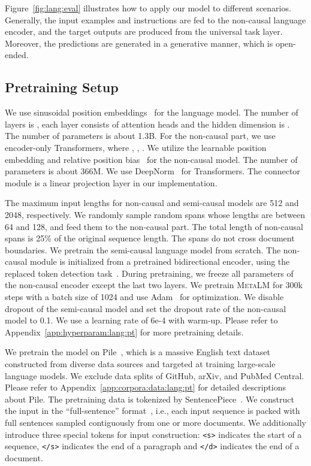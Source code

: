 \documentclass{article}
\theoremstyle{plain}
\theoremstyle{definition}
\theoremstyle{remark}
\newcommand\ours{\textsc{MetaLM}}
\begin{document}
Figure~\ref{fig:lang:eval} illustrates how to apply our model to different scenarios.
Generally, the input examples and instructions are fed to the non-causal language encoder, and the target outputs are produced from the universal task layer.
Moreover, the predictions are generated in a generative manner, which is open-ended.

\subsection{Pretraining Setup}
\label{sec:lang:setup}


We use sinusoidal position embeddings~\citep{transformer} for the language model.
The number of layers is , each layer consists of  attention heads and the hidden dimension is .
The number of parameters is about 1.3B.
For the non-causal part, we use encoder-only Transformers, where , , .
We utilize the learnable position embedding and relative position bias~\citep{t5} for the non-causal model.
The number of parameters is about 366M.
We use DeepNorm~\citep{deepnet} for Transformers.
The connector module is a linear projection layer in our implementation.

The maximum input lengths for non-causal and semi-causal models are 512 and 2048, respectively.
We randomly sample random spans whose lengths are between 64 and 128, and feed them to the non-causal part.
The total length of non-causal spans is 25\% of the original sequence length.
The spans do not cross document boundaries.
We pretrain the semi-causal language model from scratch.
The non-causal module is initialized from a pretrained bidirectional encoder, using the replaced token detection task~\citep{electra}.
During pretraining, we freeze all parameters of the non-causal encoder except the last two layers.
We pretrain \ours{} for 300k steps with a batch size of 1024 and use Adam~\citep{adam} for optimization.
We disable dropout of the semi-causal model and set the dropout rate of the non-causal model to 0.1.
We use a learning rate of 6e-4 with warm-up.
Please refer to Appendix~\ref{app:hyperparam:lang:pt} for more pretraining details.

We pretrain the model on Pile~\citep{pile}, which is a massive English text dataset constructed from diverse data sources and targeted at training large-scale language models.
We exclude data splits of GitHub, arXiv, and PubMed Central.
Please refer to Appendix~\ref{app:corpora:data:lang:pt} for detailed descriptions about Pile.
The pretraining data is tokenized by SentencePiece~\citep{sentencepiece}.
We construct the input in the ``full-sentence'' format~\citep{roberta}, i.e., each input sequence is packed with full sentences sampled contiguously from one or more documents.
We additionally introduce three special tokens for input construction: \texttt{<s>} indicates the start of a sequence, \texttt{</s>} indicates the end of a paragraph and \texttt{</d>} indicates the end of a document.
\end{document}
